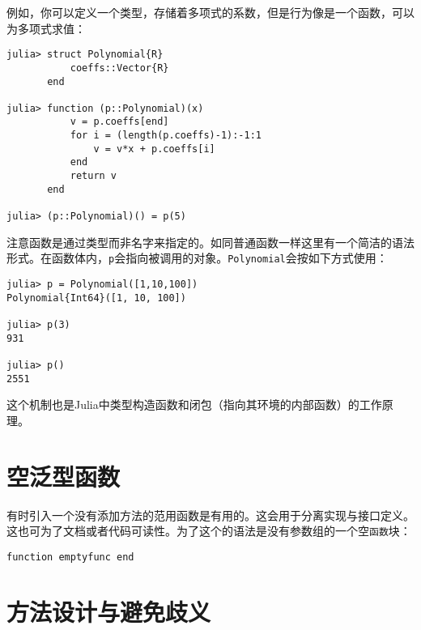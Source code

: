 例如，你可以定义一个类型，存储着多项式的系数，但是行为像是一个函数，可以为多项式求值：




\begin{verbatim}
julia> struct Polynomial{R}
           coeffs::Vector{R}
       end

julia> function (p::Polynomial)(x)
           v = p.coeffs[end]
           for i = (length(p.coeffs)-1):-1:1
               v = v*x + p.coeffs[i]
           end
           return v
       end

julia> (p::Polynomial)() = p(5)
\end{verbatim}



注意函数是通过类型而非名字来指定的。如同普通函数一样这里有一个简洁的语法形式。在函数体内，\texttt{p}会指向被调用的对象。\texttt{Polynomial}会按如下方式使用：




\begin{verbatim}
julia> p = Polynomial([1,10,100])
Polynomial{Int64}([1, 10, 100])

julia> p(3)
931

julia> p()
2551
\end{verbatim}



这个机制也是Julia中类型构造函数和闭包（指向其环境的内部函数）的工作原理。



\hypertarget{117540638029415517}{}


\section{空泛型函数}



有时引入一个没有添加方法的范用函数是有用的。这会用于分离实现与接口定义。这也可为了文档或者代码可读性。为了这个的语法是没有参数组的一个空\texttt{函数}块：




\begin{verbatim}
function emptyfunc end
\end{verbatim}



\hypertarget{11088607530909626670}{}


\section{方法设计与避免歧义}



